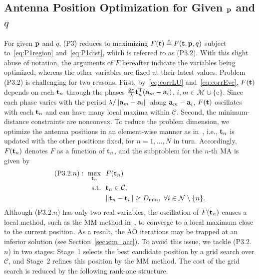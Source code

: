 \documentclass[journal]{IEEEtran}
\newcommand{\rev}[1]{{\color{red}#1}}
\newcommand{\rev}[1]{#1}
\begin{document}
\subsection{Antenna Position Optimization for Given $\mathbf{p}$ and $q$}\label{sec:position}

For given $\mathbf{p}$ and $q$, (P3) reduces to maximizing $F(\mathbf{t})\triangleq F(\mathbf{t},\mathbf{p},q)$ subject to~\eqref{eq:P1region} and~\eqref{eq:P1dist}, which is referred to as (P3.2). With this slight abuse of notation, the arguments of $F$ hereafter indicate the variables being optimized, whereas the other variables are fixed at their latest values. Problem (P3.2) is challenging for two reasons. First, by~\eqref{eq:corrLU} and~\eqref{eq:corrEve}, $F(\mathbf{t})$ depends on each $\mathbf{t}_n$ through the phases $\frac{2\pi}{\lambda}\mathbf{t}_n^{\mathrm T}(\mathbf{a}_{m}-\mathbf{a}_i)$, $i,m\in\mathcal M\cup\{\mathrm e\}$. Since each phase varies with the period $\lambda/\|\mathbf{a}_{m}-\mathbf{a}_i\|$ along $\mathbf{a}_{m}-\mathbf{a}_i$, $F(\mathbf{t})$ oscillates \rev{with each $\mathbf{t}_n$} and \rev{can have} many local maxima within $\mathcal C$. Second, the minimum-distance constraints are nonconvex. To reduce the problem dimension, we optimize the antenna positions in an element-wise manner as in~\cite{ZhengTCOM2025}, i.e., $\mathbf{t}_n$ is updated with the other positions fixed, for $n=1,\ldots,N$ in turn. Accordingly, $F(\mathbf{t}_n)$ denotes $F$ as a function of $\mathbf{t}_n$, and the subproblem for the $n$-th MA is given by
\begin{subequations}\label{eq:P32n0}
\begin{align}
(\mathrm{P3.2}.n):\ \max_{\mathbf{t}_n}\ \ & F(\mathbf{t}_n)\\
\mathrm{s.t.}\ \ & \mathbf{t}_n\in\mathcal C,\\
& \|\mathbf{t}_n-\mathbf{t}_i\|\ge D_{\min},\ \forall i\in\mathcal N\setminus\{n\}.
\end{align}
\end{subequations}
Although (P3.2.$n$) has only two real variables, the oscillation of $F(\mathbf{t}_n)$ causes a local method, such as the MM method in~\cite{ZhengTCOM2025}, to converge to a local maximum close to the current position. As a result, the AO iterations may be trapped at an inferior solution (see Section~\ref{sec:sim_acc}). To avoid this issue, we tackle (P3.2.$n$) in two stages: Stage~1 selects the best candidate position by a grid search over $\mathcal C$, and Stage~2 refines this position by the MM method. The cost of the grid search is reduced by the following rank-one structure.
\end{document}
